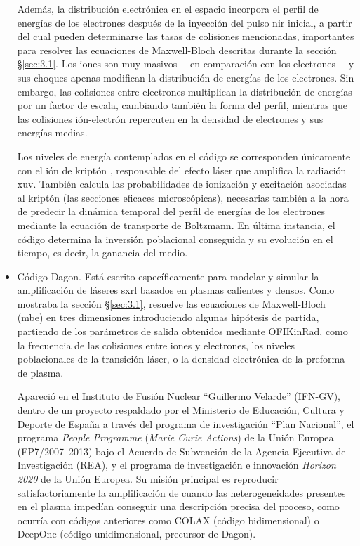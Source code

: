\begin{itemize}
      Además, la distribución electrónica en el espacio incorpora el perfil de energías de los electrones después de la inyección del pulso \acrshort{nir} inicial, a partir del cual pueden determinarse las tasas de colisiones mencionadas, importantes para resolver las ecuaciones de Maxwell-Bloch descritas durante la sección \S\ref{sec:3.1}. Los iones  son muy masivos ---en comparación con los electrones--- y sus choques apenas modifican la distribución de energías de los electrones. Sin embargo, las colisiones entre electrones multiplican la distribución de energías por un factor de escala, cambiando también la forma del perfil, mientras que las colisiones ión-electrón repercuten en la densidad de electrones y sus energías medias.

      Los niveles de energía contemplados en el código se corresponden únicamente con el ión de kriptón , responsable del efecto láser que amplifica la radiación \acrshort{xuv}. También calcula las probabilidades de ionización y excitación asociadas al kriptón (las secciones eficaces microscópicas), necesarias también a la hora de predecir la dinámica temporal del perfil de energías de los electrones mediante la ecuación de transporte de Boltzmann. En última instancia, el código determina la inversión poblacional conseguida y su evolución en el tiempo, es decir, la ganancia del medio.
    \item Código Dagon. Está escrito específicamente para modelar y simular la amplificación de láseres \acrshort{sxrl} basados en plasmas calientes y densos. Como mostraba la sección \S\ref{sec:3.1}, resuelve las ecuaciones de Maxwell-Bloch (\acrshort{mbe}) en tres dimensiones introduciendo algunas hipótesis de partida, partiendo de los parámetros de salida obtenidos mediante OFIKinRad, como la frecuencia de las colisiones entre iones y electrones, los niveles poblacionales de la transición láser, o la densidad electrónica de la preforma de plasma.
      
      Apareció en el Instituto de Fusión Nuclear \enquote{Guillermo Velarde} (IFN-GV)\autocite{Oliva2017}, dentro de un proyecto respaldado por el Ministerio de Educación, Cultura y Deporte de España a través del programa de investigación \enquote{Plan Nacional}, el programa \emph{People Programme} (\emph{Marie Curie Actions}) de la Unión Europea (FP7/\numrange{2007}{2013}) bajo el Acuerdo de Subvención de la Agencia Ejecutiva de Investigación (REA), y el programa de investigación e innovación \emph{Horizon 2020} de la Unión Europea. Su misión principal es reproducir satisfactoriamente la amplificación de  cuando las heterogeneidades presentes en el plasma impedían conseguir una descripción precisa del proceso, como ocurría con códigos anteriores como COLAX (código bidimensional)\autocite{Larroche2000,Almiev2007} o DeepOne (código unidimensional, precursor de Dagon)\autocite{Oliva2011}.


\end{itemize}
